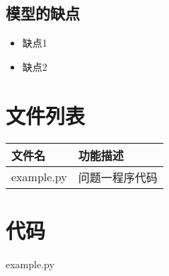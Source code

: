 \documentclass{cumcmthesis}
\begin{document}
\subsection{模型的缺点}
\begin{itemize}[itemindent=2em]
\item 缺点1
\item 缺点2
\end{itemize}




\newpage
\begin{appendices}
\section{文件列表}
\begin{table}[H]
\centering
\begin{tabularx}{\textwidth}{LL}
\toprule
文件名   & 功能描述 \\
\midrule
example.py & 问题一程序代码 \\
\bottomrule
\end{tabularx}
\label{tab:文件列表}
\end{table}

\section{代码}
\noindent example.py

\end{appendices}
\end{document}
